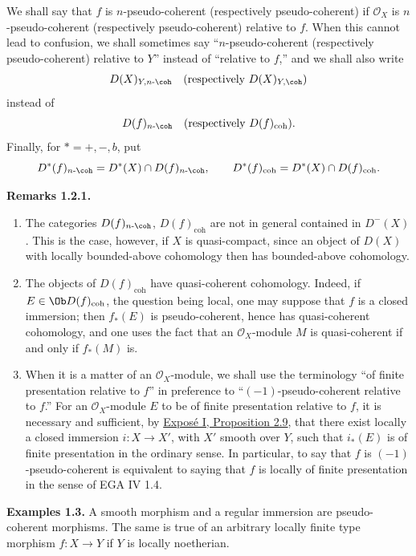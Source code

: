 We shall say that \(f\) is \(n\)-pseudo-coherent (respectively pseudo-coherent) if \(\mathcal O_X\) is \(n\)-pseudo-coherent (respectively pseudo-coherent) relative to \(f\). When this cannot lead to confusion, we shall sometimes say ``\(n\)-pseudo-coherent (respectively pseudo-coherent) relative to \(Y\)'' instead of ``relative to \(f\),'' and we shall also write
\[
  D(X)_{Y,n\text{-}\coh}\quad(\text{respectively }D(X)_{Y,\coh})
\]
instead of
\[
  D(f)_{n\text{-}\coh}\quad(\text{respectively }D(f)_{\mathrm{coh}}).
\]
Finally, for \(*=+,-,b\), put
\[
  D^*(f)_{n\text{-}\coh}=D^*(X)\cap D(f)_{n\text{-}\coh},
  \qquad
  D^*(f)_{\mathrm{coh}}=D^*(X)\cap D(f)_{\mathrm{coh}}.
\]

\textbf{Remarks 1.2.1.}
\begin{enumerate}[label=\alph*)]
\item The categories \(D(f)_{n\text{-}\coh}\), \(D(f)_{\mathrm{coh}}\) are not in general contained in \(D^{-}(X)\). This is the case, however, if \(X\) is quasi-compact, since an object of \(D(X)\) with locally bounded-above cohomology then has bounded-above cohomology.

\item The objects of \(D(f)_{\mathrm{coh}}\) have quasi-coherent cohomology. Indeed, if \(E\in \Ob D(f)_{\mathrm{coh}}\), the question being local, one may suppose that \(f\) is a closed immersion; then \(f_*(E)\) is pseudo-coherent, hence has quasi-coherent cohomology, and one uses the fact that an \(\mathcal O_X\)-module \(M\) is quasi-coherent if and only if \(f_*(M)\) is.

\item When it is a matter of an \(\mathcal O_X\)-module, we shall use the terminology ``of finite presentation relative to \(f\)'' in preference to ``\((-1)\)-pseudo-coherent relative to \(f\).'' For an \(\mathcal O_X\)-module \(E\) to be of finite presentation relative to \(f\), it is necessary and sufficient, by \hyperlink{sga6.e01.prop.2-9}{Exposé I, Proposition 2.9}, that there exist locally a closed immersion \(i:X\to X'\), with \(X'\) smooth over \(Y\), such that \(i_*(E)\) is of finite presentation in the ordinary sense. In particular, to say that \(f\) is \((-1)\)-pseudo-coherent is equivalent to saying that \(f\) is locally of finite presentation in the sense of EGA IV 1.4.
\end{enumerate}

\textbf{Examples 1.3.} A smooth morphism and a regular immersion are pseudo-coherent morphisms. The same is true of an arbitrary locally finite type morphism \(f:X\to Y\) if \(Y\) is locally noetherian.


